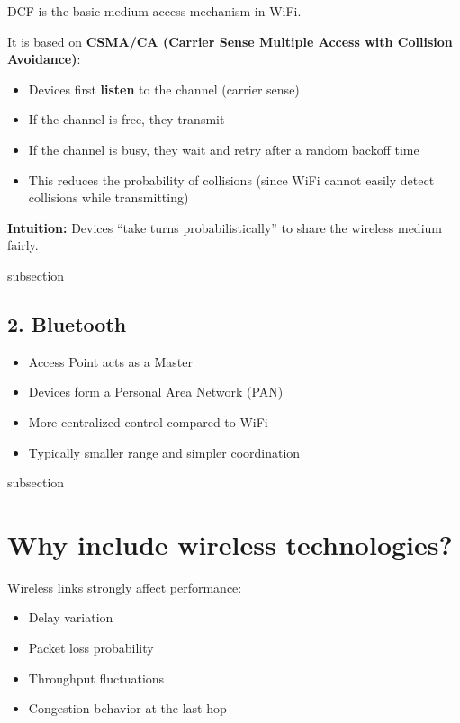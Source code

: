 DCF is the basic medium access mechanism in WiFi.

It is based on \textbf{CSMA/CA (Carrier Sense Multiple Access with Collision Avoidance)}:

\begin{itemize}
    \item Devices first \textbf{listen} to the channel (carrier sense)
    \item If the channel is free, they transmit
    \item If the channel is busy, they wait and retry after a random backoff time
    \item This reduces the probability of collisions (since WiFi cannot easily detect collisions while transmitting)
\end{itemize}

\textbf{Intuition:}
Devices ``take turns probabilistically'' to share the wireless medium fairly.

subsection

\subsection{2. Bluetooth}

\begin{itemize}
    \item Access Point acts as a Master
    \item Devices form a Personal Area Network (PAN)
    \item More centralized control compared to WiFi
    \item Typically smaller range and simpler coordination
\end{itemize}

subsection

\section{Why include wireless technologies?}

Wireless links strongly affect performance:

\begin{itemize}
    \item Delay variation
    \item Packet loss probability
    \item Throughput fluctuations
    \item Congestion behavior at the last hop
\end{itemize}

